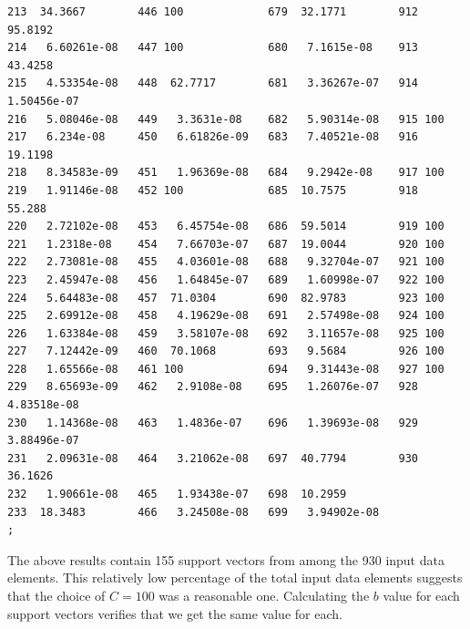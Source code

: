 \documentclass{article}
\begin{document}
\begin{verbatim}
213  34.3667        446 100             679  32.1771        912  95.8192
214   6.60261e-08   447 100             680   7.1615e-08    913  43.4258
215   4.53354e-08   448  62.7717        681   3.36267e-07   914   1.50456e-07
216   5.08046e-08   449   3.3631e-08    682   5.90314e-08   915 100
217   6.234e-08     450   6.61826e-09   683   7.40521e-08   916  19.1198
218   8.34583e-09   451   1.96369e-08   684   9.2942e-08    917 100
219   1.91146e-08   452 100             685  10.7575        918  55.288
220   2.72102e-08   453   6.45754e-08   686  59.5014        919 100
221   1.2318e-08    454   7.66703e-07   687  19.0044        920 100
222   2.73081e-08   455   4.03601e-08   688   9.32704e-07   921 100
223   2.45947e-08   456   1.64845e-07   689   1.60998e-07   922 100
224   5.64483e-08   457  71.0304        690  82.9783        923 100
225   2.69912e-08   458   4.19629e-08   691   2.57498e-08   924 100
226   1.63384e-08   459   3.58107e-08   692   3.11657e-08   925 100
227   7.12442e-09   460  70.1068        693   9.5684        926 100
228   1.65566e-08   461 100             694   9.31443e-08   927 100
229   8.65693e-09   462   2.9108e-08    695   1.26076e-07   928   4.83518e-08
230   1.14368e-08   463   1.4836e-07    696   1.39693e-08   929   3.88496e-07
231   2.09631e-08   464   3.21062e-08   697  40.7794        930  36.1626
232   1.90661e-08   465   1.93438e-07   698  10.2959
233  18.3483        466   3.24508e-08   699   3.94902e-08
;

\end{verbatim}

The above results contain 155 support vectors from among the 930 input data elements. This relatively low percentage of the total input data elements suggests that the choice of \(C=100\) was a reasonable one. Calculating the \(b\) value for each support vectors verifies that we get the same value for each.
\end{document}

